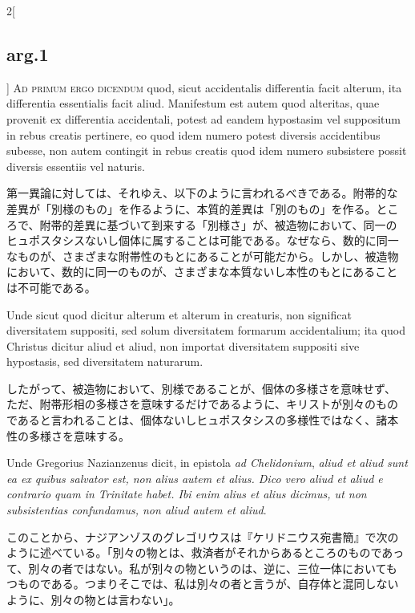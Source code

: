 \documentclass[paper=a4paper,fontsize=10pt,jafontsize=9pt,titlepage]{jlreq}
\begin{document}
\begin{paracol}{2}[\subsection{arg.1}]
{\scshape Ad primum ergo dicendum} quod, sicut accidentalis
differentia facit alterum, ita differentia essentialis facit
aliud. Manifestum est autem quod alteritas, quae provenit ex
differentia accidentali, potest ad eandem hypostasim vel suppositum in
rebus creatis pertinere, eo quod idem numero potest diversis
accidentibus subesse, non autem contingit in rebus creatis quod idem
numero subsistere possit diversis essentiis vel naturis.

\switchcolumn

第一異論に対しては、それゆえ、以下のように言われるべきである。附帯的な
差異が「別様のもの」を作るように、本質的差異は「別のもの」を作る。とこ
ろで、附帯的差異に基づいて到来する「別様さ」が、被造物において、同一の
ヒュポスタシスないし個体に属することは可能である。なぜなら、数的に同一
なものが、さまざまな附帯性のもとにあることが可能だから。しかし、被造物
において、数的に同一のものが、さまざまな本質ないし本性のもとにあること
は不可能である。

\switchcolumn*

Unde sicut quod dicitur alterum et alterum in creaturis, non
significat diversitatem suppositi, sed solum diversitatem formarum
accidentalium; ita quod Christus dicitur aliud et aliud, non importat
diversitatem suppositi sive hypostasis, sed diversitatem naturarum.

\switchcolumn

したがって、被造物において、別様であることが、個体の多様さを意味せず、
ただ、附帯形相の多様さを意味するだけであるように、キリストが別々のもの
であると言われることは、個体ないしヒュポスタシスの多様性ではなく、諸本
性の多様さを意味する。

\switchcolumn*

Unde Gregorius Nazianzenus dicit, in epistola {\itshape ad
Chelidonium}, {\itshape aliud et aliud sunt ea ex quibus salvator est,
non alius autem et alius. Dico vero aliud et aliud e contrario quam in
Trinitate habet. Ibi enim alius et alius dicimus, ut non subsistentias
confundamus, non aliud autem et aliud}.

\switchcolumn

このことから、ナジアンゾスのグレゴリウスは『ケリドニウス宛書簡』で次の
ように述べている。「別々の物とは、救済者がそれからあるところのものであっ
て、別々の者ではない。私が別々の物というのは、逆に、三位一体においても
つものである。つまりそこでは、私は別々の者と言うが、自存体と混同しない
ように、別々の物とは言わない」。

\switchcolumn*[\subsection{ad.2}]


\end{paracol}
\end{document}
